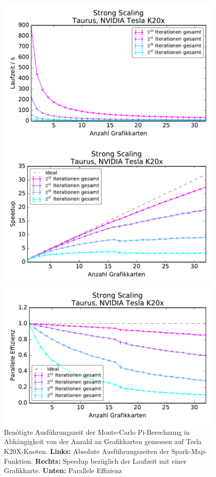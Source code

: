 \begin{figure}[H]
	\centering
	\begin{minipage}{0.5\linewidth}
		\includegraphics[width=\linewidth]{../MontePi/benchmark/strong-scaling-time-gpu.pdf}
	\end{minipage}\begin{minipage}{0.5\linewidth}
		\includegraphics[width=\linewidth]{../MontePi/benchmark/strong-scaling-speedup-gpu.pdf}
	\end{minipage}
    \centerline{\includegraphics[width=0.5\linewidth]{../MontePi/benchmark/strong-scaling-efficiency-gpu.pdf}}
	\caption{Benötigte Ausführungszeit der Monte-Carlo Pi-Berechnung in Abhängigkeit von der Anzahl an Grafikkarten gemessen auf Tesla K20X-Knoten. \textbf{Links:} Absolute Ausführungszeiten der Spark-Map-Funktion. \textbf{Rechts:} Speedup bezüglich der Laufzeit mit einer Grafikkarte. \textbf{Unten:} Parallele Effizienz}
	\label{fig:montepistrongscaling}
\end{figure}
